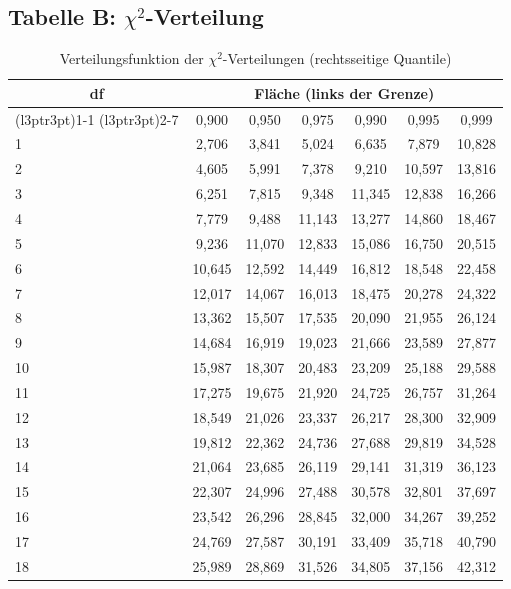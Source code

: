 \documentclass[
]{article}
\begin{document}
\newpage

\subsection{\texorpdfstring{Tabelle B:
\(\chi^2\)-Verteilung}{Tabelle B: \textbackslash chi\^{}2-Verteilung}}\label{tabelle-b-chi2-verteilung}

\begin{table}[!h]
\centering
\caption{\label{tab:tab-chi}Verteilungsfunktion der $\chi^2$-Verteilungen (rechtsseitige Quantile)}
\centering
\begin{tabular}[t]{lcccccc}
\toprule
\multicolumn{1}{c}{df} & \multicolumn{6}{c}{Fläche (links der Grenze)} \\
\cmidrule(l{3pt}r{3pt}){1-1} \cmidrule(l{3pt}r{3pt}){2-7}
  & 0,900 & 0,950 & 0,975 & 0,990 & 0,995 & 0,999\\
\midrule
1 & 2,706 & 3,841 & 5,024 & 6,635 & 7,879 & 10,828\\
2 & 4,605 & 5,991 & 7,378 & 9,210 & 10,597 & 13,816\\
3 & 6,251 & 7,815 & 9,348 & 11,345 & 12,838 & 16,266\\
4 & 7,779 & 9,488 & 11,143 & 13,277 & 14,860 & 18,467\\
5 & 9,236 & 11,070 & 12,833 & 15,086 & 16,750 & 20,515\\
6 & 10,645 & 12,592 & 14,449 & 16,812 & 18,548 & 22,458\\
7 & 12,017 & 14,067 & 16,013 & 18,475 & 20,278 & 24,322\\
8 & 13,362 & 15,507 & 17,535 & 20,090 & 21,955 & 26,124\\
9 & 14,684 & 16,919 & 19,023 & 21,666 & 23,589 & 27,877\\
10 & 15,987 & 18,307 & 20,483 & 23,209 & 25,188 & 29,588\\
11 & 17,275 & 19,675 & 21,920 & 24,725 & 26,757 & 31,264\\
12 & 18,549 & 21,026 & 23,337 & 26,217 & 28,300 & 32,909\\
13 & 19,812 & 22,362 & 24,736 & 27,688 & 29,819 & 34,528\\
14 & 21,064 & 23,685 & 26,119 & 29,141 & 31,319 & 36,123\\
15 & 22,307 & 24,996 & 27,488 & 30,578 & 32,801 & 37,697\\
16 & 23,542 & 26,296 & 28,845 & 32,000 & 34,267 & 39,252\\
17 & 24,769 & 27,587 & 30,191 & 33,409 & 35,718 & 40,790\\
18 & 25,989 & 28,869 & 31,526 & 34,805 & 37,156 & 42,312\\

\end{tabular}
\end{table}
\end{document}
